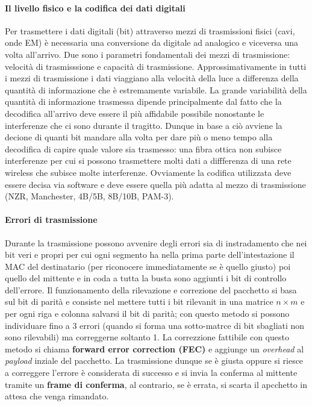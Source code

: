 \documentclass{article}
\begin{document}
\paragraph{Il livello fisico e la codifica dei dati digitali}
Per trasmettere i dati digitali (bit) attraverso mezzi di trasmissioni fisici
(cavi, onde EM) è necessaria una conversione da digitale ad analogico e
viceversa una volta all'arrivo. Due sono i parametri fondamentali dei mezzi di
trasmissione: velocità di trasmisssione e capacità di trasmissione.
Approssimativamente in tutti i mezzi di trasmissione i dati viaggiano alla
velocità della luce a differenza della quantità di informazione che è
estremamente variabile. La grande variabilità della quantità di informazione
trasmessa dipende principalmente dal fatto che la decodifica all'arrivo deve
essere il più affidabile possibile nonostante le interferenze che ci sono
durante il tragitto. Dunque in base a ciò avviene la decione di quanti bit
mandare alla volta per dare più o meno tempo alla decodifica di capire quale
valore sia trasmesso: una fibra ottica non subisce interferenze per cui si
possono trasmettere molti dati a diffferenza di una rete wireless che subisce
molte interferenze. Ovviamente la codifica utilizzata deve essere decisa via
software e deve essere quella più adatta al mezzo di trasmissione (NZR,
Manchester, 4B/5B, 8B/10B, PAM-3).

\paragraph{Errori di trasmissione}
Durante la trasmissione possono avvenire degli errori sia di instradamento che
nei bit veri e propri per cui ogni segmento ha nella prima parte
dell'intestazione il MAC del destinatario (per riconocere immediatamente se è
quello giusto) poi quello del mittente e in coda a tutta la busta sono aggiunti
i bit di controllo dell'errore. Il funzionamento della rilevazione e correzione
del pacchetto si basa sul bit di parità e consiste nel mettere tutti i bit
rilevanit in una matrice $n \times m$ e per ogni riga e colonna salvarsi il bit
di parità; con questo metodo si possono individuare fino a 3 errori (quando si
forma una sotto-matrce di bit sbagliati non sono rilevabili) ma correggerne
soltanto 1. La correzzione fattibile con questo metodo si chiama
\textbf{forward error correction (FEC)} e aggiunge un \textit{overhead} al
\textit{payload} inziale del pacchetto. La trasmissione dunque se è giusta
oppure si riesce a correggere l'errore è considerata di successo e si invia la
conferma al mittente tramite un \textbf{frame di conferma}, al contrario, se è
errata, si scarta il apcchetto in attesa che venga rimandato.
\end{document}

